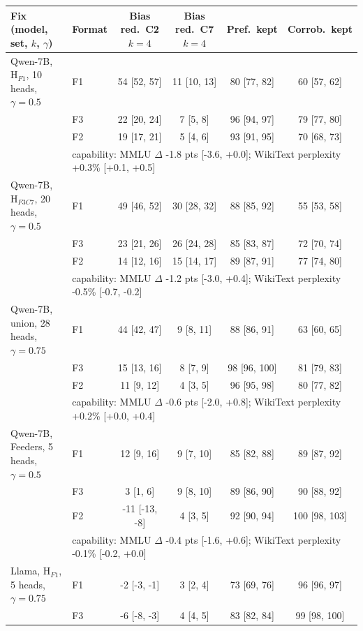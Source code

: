 \begin{table}[!htbp]\centering\scriptsize\setlength{\tabcolsep}{3pt}\begin{tabular}{@{}llcccc@{}}\toprule
Fix (model, set, $k$, $\gamma$) & Format & Bias red.\ C2 $k{=}4$ & Bias red.\ C7 $k{=}4$ & Pref.\ kept & Corrob.\ kept \\ \midrule
Qwen-7B, H$_{F1}$, 10 heads, $\gamma{=}0.5$ & F1 & 54 [52, 57] & 11 [10, 13] & 80 [77, 82] & 60 [57, 62] \\
 & F3 & 22 [20, 24] & 7 [5, 8] & 96 [94, 97] & 79 [77, 80] \\
 & F2 & 19 [17, 21] & 5 [4, 6] & 93 [91, 95] & 70 [68, 73] \\
 & \multicolumn{5}{l}{capability: MMLU $\Delta$ -1.8 pts [-3.6, +0.0]; WikiText perplexity +0.3\% [+0.1, +0.5]} \\ \midrule
Qwen-7B, H$_{F3C7}$, 20 heads, $\gamma{=}0.5$ & F1 & 49 [46, 52] & 30 [28, 32] & 88 [85, 92] & 55 [53, 58] \\
 & F3 & 23 [21, 26] & 26 [24, 28] & 85 [83, 87] & 72 [70, 74] \\
 & F2 & 14 [12, 16] & 15 [14, 17] & 89 [87, 91] & 77 [74, 80] \\
 & \multicolumn{5}{l}{capability: MMLU $\Delta$ -1.2 pts [-3.0, +0.4]; WikiText perplexity -0.5\% [-0.7, -0.2]} \\ \midrule
Qwen-7B, union, 28 heads, $\gamma{=}0.75$ & F1 & 44 [42, 47] & 9 [8, 11] & 88 [86, 91] & 63 [60, 65] \\
 & F3 & 15 [13, 16] & 8 [7, 9] & 98 [96, 100] & 81 [79, 83] \\
 & F2 & 11 [9, 12] & 4 [3, 5] & 96 [95, 98] & 80 [77, 82] \\
 & \multicolumn{5}{l}{capability: MMLU $\Delta$ -0.6 pts [-2.0, +0.8]; WikiText perplexity +0.2\% [+0.0, +0.4]} \\ \midrule
Qwen-7B, Feeders, 5 heads, $\gamma{=}0.5$ & F1 & 12 [9, 16] & 9 [7, 10] & 85 [82, 88] & 89 [87, 92] \\
 & F3 & 3 [1, 6] & 9 [8, 10] & 89 [86, 90] & 90 [88, 92] \\
 & F2 & -11 [-13, -8] & 4 [3, 5] & 92 [90, 94] & 100 [98, 103] \\
 & \multicolumn{5}{l}{capability: MMLU $\Delta$ -0.4 pts [-1.6, +0.6]; WikiText perplexity -0.1\% [-0.2, +0.0]} \\ \midrule
Llama, H$_{F1}$, 5 heads, $\gamma{=}0.75$ & F1 & -2 [-3, -1] & 3 [2, 4] & 73 [69, 76] & 96 [96, 97] \\
 & F3 & -6 [-8, -3] & 4 [4, 5] & 83 [82, 84] & 99 [98, 100] \\

\end{tabular}
\end{table}
